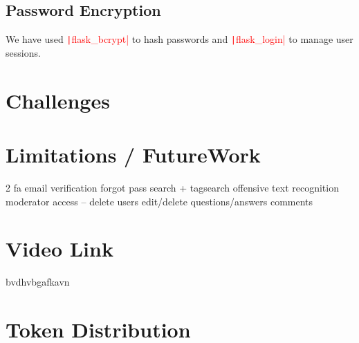 \documentclass{article}
\begin{document}
\subsection{Password Encryption}
We have used \textcolor{red}{\texttt|flask_bcrypt|} to hash passwords and \textcolor{red}{\texttt|flask_login|} to manage user sessions.
\section{Challenges}

\section{Limitations / FutureWork}
2 fa email verification
forgot pass 
search + tagsearch  
offensive text recognition
moderator access -- delete users
edit/delete questions/answers
comments  
\section{Video Link}
bvdhvbgafkavn
\section{Token Distribution}
\end{document}
